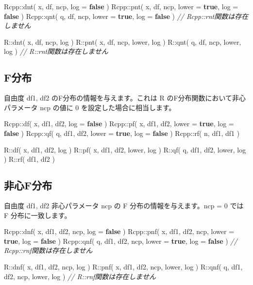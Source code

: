 \documentclass[]{book}
\newenvironment{Shaded}{\begin{snugshade}}{\end{snugshade}}
\newcommand{\CommentTok}[1]{\textcolor[rgb]{0.56,0.35,0.01}{\textit{#1}}}
\newcommand{\KeywordTok}[1]{\textcolor[rgb]{0.13,0.29,0.53}{\textbf{#1}}}
\newcommand{\NormalTok}[1]{#1}
\begin{document}
\begin{Shaded}
\begin{Highlighting}[]
\NormalTok{Rcpp::dnt( x, df, ncp,               log = }\KeywordTok{false}\NormalTok{  )}
\NormalTok{Rcpp::pnt( x, df, ncp, lower = }\KeywordTok{true}\NormalTok{, log = }\KeywordTok{false}\NormalTok{  )}
\NormalTok{Rcpp::qnt( q, df, ncp, lower = }\KeywordTok{true}\NormalTok{, log = }\KeywordTok{false}\NormalTok{  )}
\CommentTok{// Rcpp::rnt関数は存在しません}

\NormalTok{R::dnt( x, df, ncp,        log )}
\NormalTok{R::pnt( x, df, ncp, lower, log )}
\NormalTok{R::qnt( q, df, ncp, lower, log )}
\CommentTok{// R::rnt関数は存在しません}
\end{Highlighting}
\end{Shaded}

\hypertarget{f}{%
\subsection{F分布}\label{f}}

自由度 df1, df2 のF分布の情報を与えます。これは R のF分布関数において非心パラメータ ncp の値に 0 を設定した場合に相当します。

\begin{Shaded}
\begin{Highlighting}[]
\NormalTok{Rcpp::df( x, df1, df2,               log = }\KeywordTok{false}\NormalTok{ )}
\NormalTok{Rcpp::pf( x, df1, df2, lower = }\KeywordTok{true}\NormalTok{, log = }\KeywordTok{false}\NormalTok{ )}
\NormalTok{Rcpp::qf( q, df1, df2, lower = }\KeywordTok{true}\NormalTok{, log = }\KeywordTok{false}\NormalTok{ )}
\NormalTok{Rcpp::rf( n, df1, df1 )}

\NormalTok{R::df( x, df1, df2,        log )}
\NormalTok{R::pf( x, df1, df2, lower, log )}
\NormalTok{R::qf( q, df1, df2, lower, log )}
\NormalTok{R::rf(    df1, df2 )}
\end{Highlighting}
\end{Shaded}

\hypertarget{f}{%
\subsection{非心F分布}\label{f}}

自由度 df1, df2 非心パラメータ ncp の F 分布の情報を与えます。ncp = 0 では F 分布に一致します。

\begin{Shaded}
\begin{Highlighting}[]
\NormalTok{Rcpp::dnf( x, df1, df2, ncp,               log = }\KeywordTok{false}\NormalTok{ )}
\NormalTok{Rcpp::pnf( x, df1, df2, ncp, lower = }\KeywordTok{true}\NormalTok{, log = }\KeywordTok{false}\NormalTok{ )}
\NormalTok{Rcpp::qnf( q, df1, df2, ncp, lower = }\KeywordTok{true}\NormalTok{, log = }\KeywordTok{false}\NormalTok{ )}
\CommentTok{// Rcpp::rnf関数は存在しません}

\NormalTok{R::dnf( x, df1, df2, ncp,        log )}
\NormalTok{R::pnf( x, df1, df2, ncp, lower, log )}
\NormalTok{R::qnf( q, df1, df2, ncp, lower, log )}
\CommentTok{// R::rnf関数は存在しません}
\end{Highlighting}
\end{Shaded}
\end{document}
